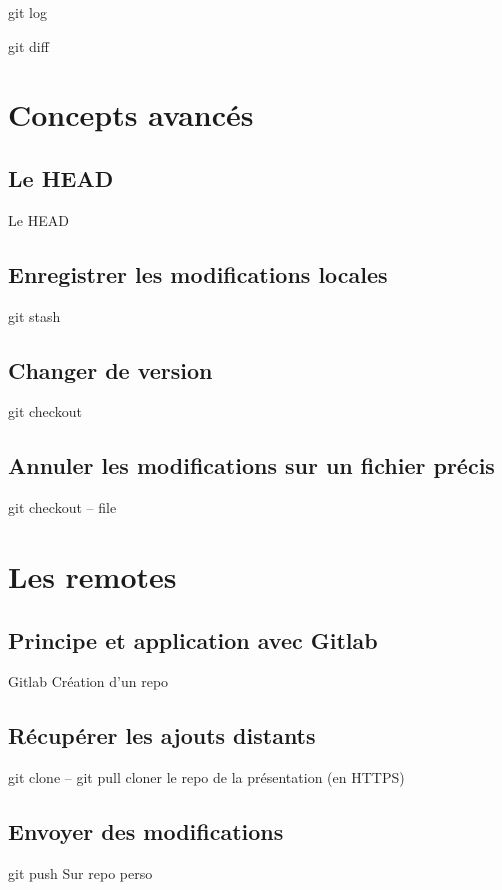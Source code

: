 \documentclass[usepdftitle=false]{beamer}
\begin{document}
\begin{frame}{git log}
\end{frame}

\begin{frame}{git diff}
\end{frame}

\section{Concepts avancés}

\subsection{Le HEAD}

\begin{frame}{Le HEAD}
\end{frame}

\subsection{Enregistrer les modifications locales}

\begin{frame}{git stash}
\end{frame}

\subsection{Changer de version}

\begin{frame}{git checkout}
\end{frame}

\subsection{Annuler les modifications sur un fichier précis}

\begin{frame}{git checkout -- file}
\end{frame}

\section{Les remotes}

\subsection{Principe et application avec Gitlab}

\begin{frame}{Gitlab}
	Création d'un repo
\end{frame}

\subsection{Récupérer les ajouts distants}

\begin{frame}{git clone -- git pull}
	cloner le repo de la présentation (en HTTPS)
\end{frame}

\subsection{Envoyer des modifications}

\begin{frame}{git push}
	Sur repo perso
\end{frame}
\end{document}
